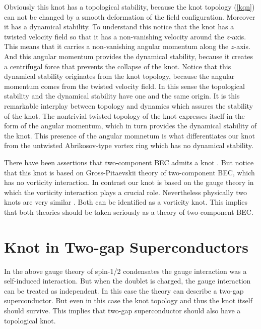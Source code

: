 \documentclass[twocolumn,showpacs,showkeys]{revtex4}
\begin{document}
Obviously this knot has a topological stability, because 
the knot topology (\ref{kqn}) can not be changed by a smooth 
deformation of the field configuration. Moreover it has 
a dynamical stability. To understand this notice that
the knot has a twisted velocity field so that it has a
non-vanishing velocity around the $z$-axis.
This means that it carries a non-vanishing angular momentum along 
the $z$-axis. And this angular momentum provides 
the dynamical stability, because it creates a centrifugal force that 
prevents the collapse of the knot. Notice that this dynamical 
stability originates from the knot topology, because 
the angular momentum comes from the twisted velocity field. 
In this sense the topological stability and the dynamical stability
have one and the same origin. It is this remarkable 
interplay between topology and dynamics which assures 
the stability of the knot. The nontrivial twisted topology of 
the knot expresses itself in the form of the angular momentum, 
which in turn provides the dynamical stability of the knot. 
This presence of the angular momnetum is 
what differentiates our
knot from the untwisted Abrikosov-type vortex ring 
which has no dynamical stability.  

There have been assertions that two-component BEC admits
a knot \cite{ruo}. But notice that this knot is based on 
Gross-Pitaevskii theory of two-component BEC, which has no
vorticity interaction. In contrast our knot is based on 
the gauge theory in which the vorticity 
interaction plays a crucial role. Nevertheless physically two knots 
are very similar \cite{bec5}. Both can be identified as 
a vorticity knot. This implies that both theories should be 
taken seriously as a theory of two-component BEC.

\section{Knot in Two-gap Superconductors}

In the above gauge theory of spin-1/2   
condensates the gauge interaction was a  
self-induced interaction. But when the doublet is charged,
the gauge interaction can be treated as independent.
In this case the theory can describe a two-gap superconductor.
But even in this case the knot topology and thus the knot itself
should survive. This implies that two-gap 
superconductor should also have
a topological knot.
\end{document}
